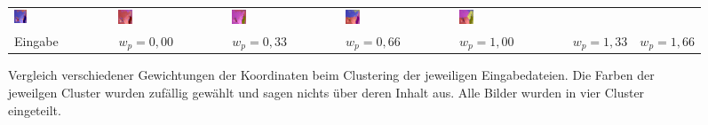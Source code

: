 \begin{figure}[h!]
\begin{tabular}{p{}p{}p{}p{}p{}p{}p{}}
		\includegraphics[width=0.14\textwidth]{images/gen/GEN_filterbanks_p03_04_MR_pos_0.33.png} &
		\includegraphics[width=0.14\textwidth]{images/gen/GEN_filterbanks_p03_04_MR_pos_0.66.png} &
		\includegraphics[width=0.14\textwidth]{images/gen/GEN_filterbanks_p03_04_MR_pos_1.0.png} &
		\includegraphics[width=0.14\textwidth]{images/gen/GEN_filterbanks_p03_04_MR_pos_1.33.png} &
		\includegraphics[width=0.14\textwidth]{images/gen/GEN_filterbanks_p03_04_MR_pos_1.66.png} \\
		
		\hspace{2pt}\newline\centering Eingabe & 
		\hspace{2pt}\newline\centering $w_p=0,00$ &
		\hspace{2pt}\newline\centering $w_p=0,33$ &
		\hspace{2pt}\newline\centering $w_p=0,66$ &
		\hspace{2pt}\newline\centering $w_p=1,00$ &
		\hspace{2pt}\newline\centering $w_p=1,33$ &
		\hspace{2pt}\newline\centering $w_p=1,66$
	\end{tabular}
	\caption{Vergleich verschiedener Gewichtungen der Koordinaten beim Clustering der jeweiligen Eingabedateien. Die Farben der jeweilgen Cluster wurden zufällig gewählt und sagen nichts über deren Inhalt aus. Alle Bilder wurden in vier Cluster eingeteilt.}
	\label{fig:filterbank_weights_pos}
\end{figure}

